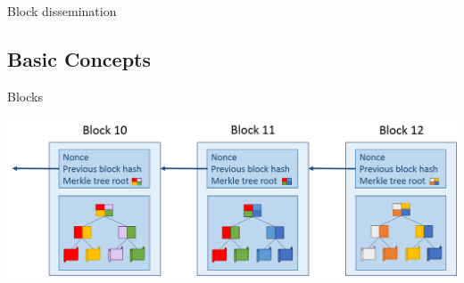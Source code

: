 \begin{frame}{Block dissemination}
\begin{center}
    \end{center}    
\end{frame}

%
\subsection{Basic Concepts}



\begin{frame}{Blocks}
    \begin{center}
        \includegraphics[scale=0.36]{Figures/blocks.png}
    \end{center}
\end{frame}

